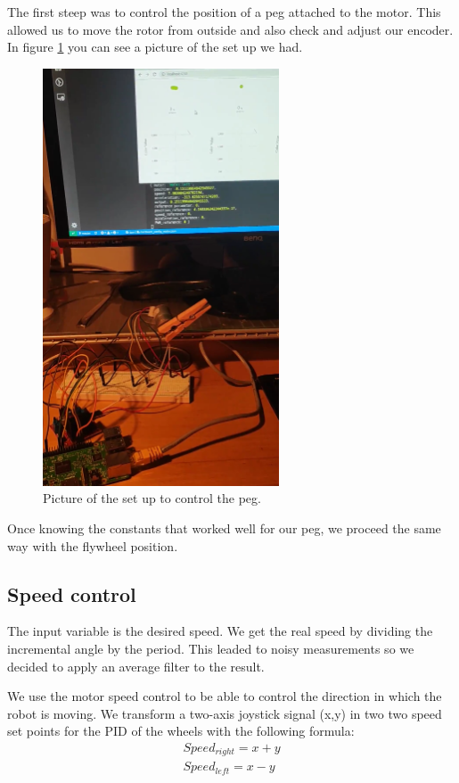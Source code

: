 The first steep was to control the position of a peg attached to the motor.
This allowed us to move the rotor from outside and also check and adjust our encoder.
In figure \ref{fig: control peg} you can see a picture of the set up we had.

\begin{figure}[H]
    \centering
    \includegraphics[width=7cm]{img/peg.png}
    \caption{Picture of the set up to control the peg.}
    \label{fig: control peg}
\end{figure}

Once knowing the constants that worked well for our peg,
we proceed the same way with the flywheel position.


\subsection{Speed control}
The input variable is the desired speed. We get the real speed by dividing the incremental angle
by the period. This leaded to noisy measurements so we decided to apply an average filter to
the result.

We use the motor speed control to be able to control the direction in which the robot is moving.
We transform a two-axis joystick signal (x,y) in two two speed set points for the PID of the wheels
 with the following formula:
\begin{equation}
    \begin{split}
    Speed_{right} = x + y \\
    Speed_{left} = x - y    
    \end{split}
\end{equation}

